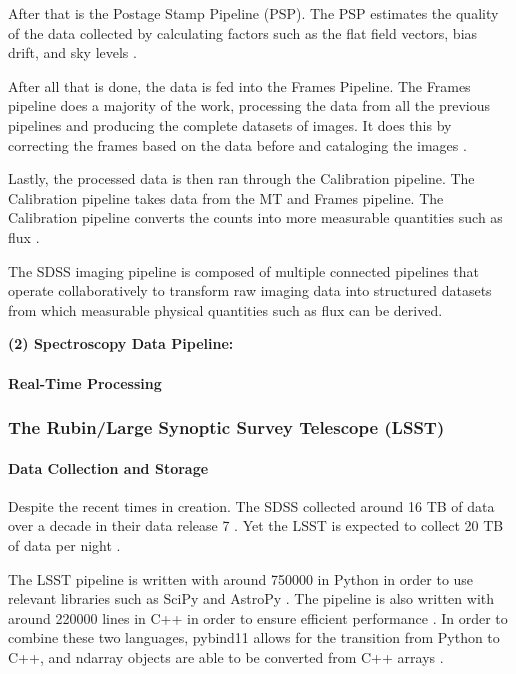 \documentclass[preprint,linenumbers, longauthor]{aastex631}
\begin{document}
  After that is the Postage Stamp Pipeline (PSP). 
  The PSP estimates the quality of the data collected by calculating factors such as the flat field vectors, bias drift, and sky levels \citep{luptonSDSSImagingPipelines2001}.

  After all that is done, the data is fed into the Frames Pipeline. The Frames pipeline does a majority of the work, processing the data from all the previous pipelines and producing the complete datasets of images.
  It does this by correcting the frames based on the data before and cataloging the images \citep{luptonSDSSImagingPipelines2001}.

  Lastly, the processed data is then ran through the Calibration pipeline. The Calibration pipeline takes data from the MT and Frames pipeline. The Calibration pipeline converts the counts into more measurable quantities such as flux \citep{luptonSDSSImagingPipelines2001}.

The SDSS imaging pipeline is composed of multiple connected pipelines that operate collaboratively to transform raw imaging data into structured datasets from which measurable physical quantities such as flux can be derived.

 \textbf{(2) Spectroscopy Data Pipeline:} 
 


\paragraph{Real-Time Processing} 


\subsubsection{The Rubin/Large Synoptic Survey Telescope (LSST)}
\paragraph{Data Collection and Storage}
Despite the recent times in creation. The SDSS collected around 16 TB of data over a decade in their data release 7 \citep{juricLSSTDataManagement2017}. Yet the LSST is expected to collect 20 TB of data per night \citep{nsf-doeverac.rubinobservatoryPSTN019LSSTScience2025}.

The LSST pipeline is written with around 750000 in Python in order to use relevant libraries such as SciPy and AstroPy \citep{nsf-doeverac.rubinobservatoryPSTN019LSSTScience2025}.
The pipeline is also written with around 220000 lines in C++ in order to ensure efficient performance \citep{nsf-doeverac.rubinobservatoryPSTN019LSSTScience2025}.
In order to combine these two languages, pybind11 allows for the transition from Python to C++, and ndarray objects are able to be converted from C++ arrays \citep{nsf-doeverac.rubinobservatoryPSTN019LSSTScience2025}.
\end{document}
